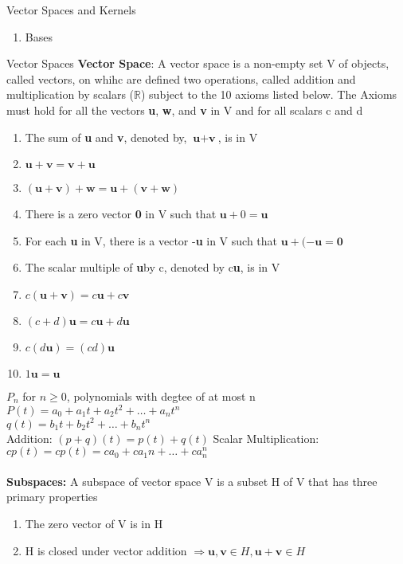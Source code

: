 \documentclass[a4paper, 12pt]{article}
\begin{document}
\begin{section}{Vector Spaces and Kernels}
\begin{subsection}
\begin{enumerate}
\item{Bases}
\end{enumerate}
\end{subsection}
\begin{subsection}{Vector Spaces}
\textbf{Vector Space}: A vector space is a non-empty set V of objects,
called vectors, on whihc are defined two operations, called addition
and multiplication by scalars ($\mathbb{R}$) subject to the 10 axioms
listed below. The Axioms must hold for all the vectors \textbf{u},
\textbf{w}, and \textbf{v} in V and for all scalars c and d
\begin{enumerate}
\item{The sum of \textbf{u} and \textbf{v}, denoted by,
$\textbf{u}+\textbf{v}$, is in V}
\item{$\textbf{u}+\textbf{v}=\textbf{v}+\textbf{u}$}
\item{$(\textbf{u}+\textbf{v})+\textbf{w}=
\textbf{u}+(\textbf{v}+\textbf{w})$}
\item{There is a zero vector \textbf{0} in V such that 
$\textbf{u}+0=\textbf{u}$}
\item{For each \textbf{u} in V, there is a vector -\textbf{u} in V
such that $\textbf{u}+(-\textbf{u}=\textbf{0}$}
\item{The scalar multiple of \textbf{u}by c, denoted by c\textbf{u}, is
in V}
\item{$c(\textbf{u}+\textbf{v})=c \textbf{u}+c \textbf{v}$}
\item{$(c+d)\textbf{u}=c\textbf{u}+d\textbf{u}$}
\item{$c(d\textbf{u})=(cd)\textbf{u}$}
\item{$1\textbf{u}=\textbf{u}$}
\end{enumerate}
$P_{n}$ for $n \geq 0$, polynomials with degtee of at most n
$P(t)=a_0+a_1t+a_2t^{2}+\dots+a_{n}t^{n}$\\
$q(t)=b_1t+b_2t^{2}+\dots+b_{n}t^{n}$\\
Addition:
$(p+q)(t)=p(t)+q(t)$
Scalar Multiplication:
$cp(t)=cp(t)=ca_0+ca_1n+\dots+ca_{n}^{n}$
\\ \\
\textbf{Subspaces:} A subspace of vector space V is a subset H of V that 
has three primary properties\\
\begin{enumerate}
\item{The zero vector of V is in H}
\item{H is closed under vector addition $\Rightarrow \textbf{u},
\textbf{v} \in H, \textbf{u}+\textbf{v}\in H$}

\end{enumerate}
\end{subsection}
\end{section}
\end{document}
